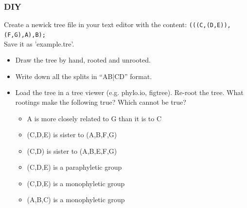 \documentclass{beamer}
\begin{document}
\begin{frame}
\frametitle{DIY}
Create a newick tree file in your text editor with the content:
\texttt{(((C,(D,E)),(F,G),A),B);}\\
Save it as 'example.tre'.\\
\begin{itemize}
 \item[1] Draw the tree by hand, rooted and unrooted.
 \item[2] Write down all the splits in ``AB|CD'' format.
 \item[3] Load the tree in a tree viewer (e.g. phylo.io, figtree). Re-root  the tree. What rootings make the following true? Which cannot be true?
 \begin{itemize}
 \item[a.] A is more closely related to G than it is to C
 \item[b] (C,D,E) is sister to (A,B,F,G)
 \item[c] (C,D) is sister to (A,B,E,F,G)
 \item[d] (C,D,E) is a paraphyletic group
 \item[e] (C,D,E) is a monophyletic group
 \item[f] (A,B,C) is a monophyletic group
 \end{itemize}
\end{itemize}
\end{frame}
\end{document}
